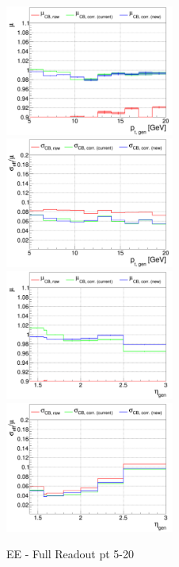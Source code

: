\begin{figure}
\includegraphics[width=0.495\textwidth]{./plots_pdf/ECAL_plots/plotsPU/EE/FULL/pdf/GENPT/EEFULL_GENPT_0005_0020_MuOverBins.pdf}
\includegraphics[width=0.495\textwidth]{./plots_pdf/ECAL_plots/plotsPU/EE/FULL/pdf/GENPT/EEFULL_GENPT_0005_0020_EffSigmaOverBins.pdf}
\includegraphics[width=0.495\textwidth]{./plots_pdf/ECAL_plots/plotsPU/EE/FULL/pdf/GENETA/EEFULL_GENETA_0005_0020_MuOverBins.pdf}
\includegraphics[width=0.495\textwidth]{./plots_pdf/ECAL_plots/plotsPU/EE/FULL/pdf/GENETA/EEFULL_GENETA_0005_0020_EffSigmaOverBins.pdf}
\caption{EE - Full Readout pt 5-20}
\end{figure}

